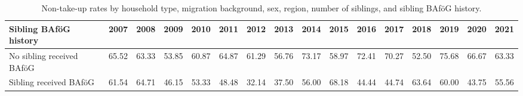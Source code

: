 \begin{landscape}
\begin{table}[htbp]
\begin{tabular}{lccccccccccccccc}
\midrule
Sibling BAföG history & 2007 & 2008 & 2009 & 2010 & 2011 & 2012 & 2013 & 2014 & 2015 & 2016 & 2017 & 2018 & 2019 & 2020 & 2021 \\
\midrule
No sibling received BAföG & 65.52 & 63.33 & 53.85 & 60.87 & 64.87 & 61.29 & 56.76 & 73.17 & 58.97 & 72.41 & 70.27 & 52.50 & 75.68 & 66.67 & 63.33 \\
Sibling received BAföG    & 61.54 & 64.71 & 46.15 & 53.33 & 48.48 & 32.14 & 37.50 & 56.00 & 68.18 & 44.44 & 44.74 & 63.64 & 60.00 & 43.75 & 55.56 \\
\bottomrule
\end{tabular}
\caption{Non-take-up rates by household type, migration background, sex, region, number of siblings, and sibling BAföG history.}
\end{table}
\end{landscape}
